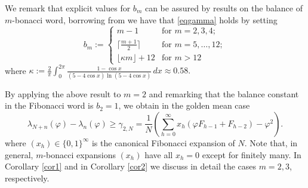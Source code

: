 \documentclass{amsart}
\begin{document}
We remark that explicit values for $b_m$ can be assured by results on the balance of $m$-bonacci word, borrowing from \cite{bal,balancetrib,generalbalance} we have that \eqref{eqgamma} holds by setting 
\begin{equation}\label{bm}
b_m:=\begin{cases}
    m-1 & \text{for } m=2,3,4;\\
    \lceil \frac{m+1}{2}\rceil& \text{for } m=5,\dots,12;\\
    \lfloor \kappa m\rfloor+12 & \text{for } m>12
\end{cases}\end{equation}
where $\kappa:= \frac{2}{\pi} \int_{0}^{2\pi}
\frac{1-\cos x}{(5-4\cos x)\ln(5-4\cos x)} \, dx \approx 0.58.$



By applying the above result to $m=2$ and remarking that the balance constant in the Fibonacci word is $b_2=1$, we obtain in the golden mean case 
$$\lambda_{N+n}(\varphi)-\lambda_{n}(\varphi)\geq \gamma_{2,N}=
\frac{1}{N}
\left(
\sum_{h=0}^\infty x_h(\varphi F_{h-1}+F_{h-2})
-\varphi^2
\right).$$
where $(x_h)\in\{0,1\}^\infty$ is the canonical Fibonacci expansion of $N$. Note that, in general, $m$-bonacci expansions $(x_h)$ 
have all $x_h=0$ except for finitely many. In Corollary \ref{cor1} and in Corollary \ref{cor2} we discuss in detail the cases $m=2,3$, respectively. 
\medskip
\end{document}
